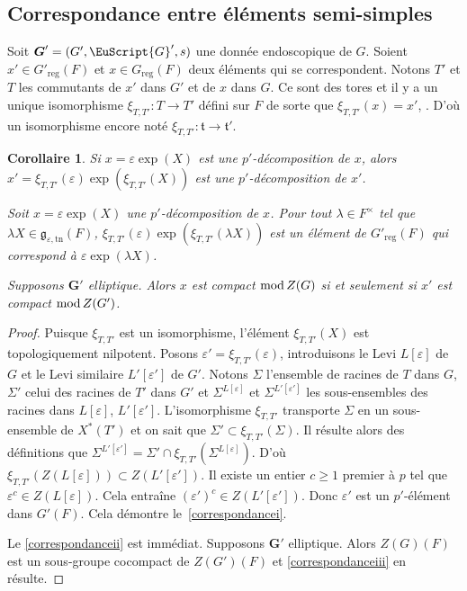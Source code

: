 \documentclass[JEP,XML,SOM,Unicode,francais]{cedram}
\let\mathcal \EuScript
\let\oldenumerate\enumerate
\renewcommand{\enumerate}{\oldenumerate\itemindent0pt}
\newenvironment{enumeratei}
{\bgroup\def\theenumi{\roman{enumi}}\def\theenumii{\arabic{enumii}}\oldenumerate}
{\endenumerate\egroup}
\let\epsilon\varepsilon
\newcommand{\rmod}{\textup{mod}\,}
\newcommand{\frg}{\mathfrak{g}}
\newcommand{\frt}{\mathfrak{t}}
\newcommand{\reg}{\mathrm{reg}}
\newcommand{\tn}{\mathrm{tn}}
\newcommand{\bG}{\boldsymbol{G}}
\newcommand{\cG}{\mathcal{G}}
\theoremstyle{plain}
\newtheorem*{cor*}{Corollaire}
\theoremstyle{definition}
\begin{document}
\subsection{Correspondance entre éléments semi-simples}\label{correspondance}
Soit $\bG'=(G',\cG',s)$ une donnée endoscopique de $G$. Soient $x'\in G'_{\reg}(F)$ et $x\in G_{\reg}(F)$ deux éléments qui se correspondent. Notons $T'$ et $T$ les commutants de $x'$ dans $G'$ et de $x$ dans $G$. Ce sont des tores et il y a un unique isomorphisme $\xi_{T,T'}:T\to T'$ défini sur $F$ de sorte que $\xi_{T,T'}(x)=x'$, \cf \cite[I.1.10]{MW}. D'où un isomorphisme encore noté $\xi_{T,T'}:\frt\to \frt'$.

\skpt
\begin{cor*}
\begin{enumeratei}
\item\label{correspondancei}
Si $x=\epsilon \exp(X)$ est une $p'$-décomposition de $x$, alors $x'=\xi_{T,T'}(\epsilon)\exp(\xi_{T,T'}(X))$ est une $p'$-décomposition de $x'$.

\item\label{correspondanceii}
Soit $x=\epsilon \exp(X)$ une $p'$-décomposition de $x$. Pour tout $\lambda\in F^{\times}$ tel que $ \lambda X\in \frg_{\epsilon,\tn}(F)$, $\xi_{T,T'}(\epsilon)\exp(\xi_{T,T'}(\lambda X))$ est un élément de $G'_{\reg}(F)$ qui correspond à $\epsilon \exp(\lambda X)$.

\item\label{correspondanceiii}
Supposons $\bG'$ elliptique. Alors $x$ est compact $\rmod Z(G)$ si et seulement si $x'$ est compact $\rmod Z(G')$.
\end{enumeratei}
\end{cor*}

\begin{proof}
Puisque $\xi_{T,T'}$ est un isomorphisme, l'élément $\xi_{T,T'}(X)$ est topologiquement nilpotent. Posons $\epsilon'=\xi_{T,T'}(\epsilon)$, introduisons le Levi $L[\epsilon]$ de $G$ et le Levi similaire $L'[\epsilon']$ de $G'$. Notons $\Sigma$ l'ensemble de racines de $T$ dans $G$, $\Sigma'$ celui des racines de $T'$ dans $G'$ et $\Sigma^{L[\epsilon]}$ et $\Sigma^{L'[\epsilon']}$ les sous-ensembles des racines dans $L[\epsilon]$, \resp $L'[\epsilon']$. L'isomorphisme $\xi_{T,T'}$ transporte $\Sigma$ en un sous-ensemble de $X^*(T')$ et on sait que $\Sigma'\subset \xi_{T,T'}(\Sigma)$. Il résulte alors des définitions que $\Sigma^{L'[\epsilon']}=\Sigma'\cap \xi_{T,T'}(\Sigma^{L[\epsilon]})$. D'où $\xi_{T,T'}(Z(L[\epsilon]))\subset Z(L'[\epsilon'])$. Il existe un entier $c\geq1$ premier à $p$ tel que $\epsilon^c\in Z(L[\epsilon])$. Cela entraîne $(\epsilon')^c\in Z(L'[\epsilon'])$. Donc $\epsilon'$ est un $p'$-élément dans $G'(F)$. Cela démontre le~\eqref{correspondancei}.

Le \eqref{correspondanceii} est immédiat. Supposons $\bG'$ elliptique. Alors $Z(G)(F)$ est un sous-groupe cocompact de $Z(G')(F)$ et \eqref{correspondanceiii} en résulte.
\end{proof}
\end{document}
